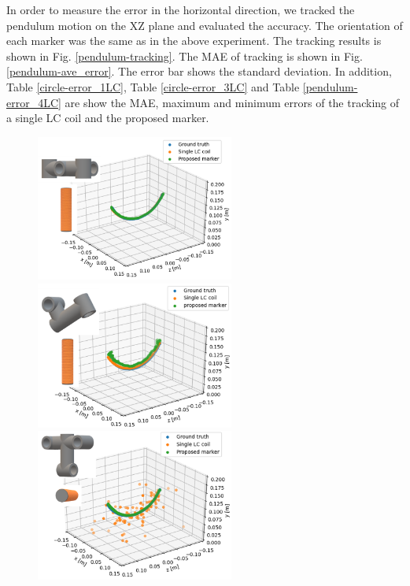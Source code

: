 \documentclass[journal,twoside,web]{ieeecolor}
\begin{document}
In order to measure the error in the horizontal direction, we tracked the pendulum motion on the XZ plane and evaluated the accuracy. The orientation of each marker was the same as in the above experiment. The tracking results is shown in Fig. \ref{pendulum-tracking}. The MAE of tracking is shown in Fig. \ref{pendulum-ave_error}. The error bar shows the standard deviation. In addition, Table \ref{circle-error_1LC}, Table \ref{circle-error_3LC} and Table \ref{pendulum-error_4LC} are show the MAE, maximum and minimum errors of the tracking of a single LC coil and the proposed marker.

\begin{figure}[t]
  \begin{minipage}{0.5\hsize}
  \begin{center}
   \centerline{\includegraphics[width=65mm]{figure/pendulum_x-axis_0deg_4LC_2.png}}
  \end{center}
 \end{minipage}
  \begin{minipage}{0.5\hsize}
  \begin{center}
   \centerline{\includegraphics[width=65mm]{figure/pendulum-x0_2.png}}
  \end{center}
 \end{minipage}
 \begin{minipage}{0.5\hsize}
  \begin{center}
   \centerline{\includegraphics[width=65mm]{figure/pendulum_z-axis_90deg_4LC_2.png}}

\end{center}
\end{minipage}
\end{figure}
\end{document}
